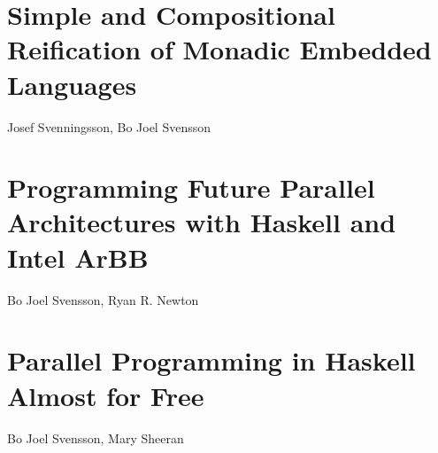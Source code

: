 \documentclass[a4paper]{book}
\begin{document}


% 
\cleardoublepage 


\section{Simple and Compositional Reification of Monadic Embedded Languages}

\begin{center} 
Josef Svenningsson, Bo Joel Svensson
\end{center}



% 
\cleardoublepage 


\section{Programming Future Parallel Architectures with Haskell and Intel ArBB}

\begin{center} 
Bo Joel Svensson, Ryan R. Newton
\end{center}




% 
\cleardoublepage 


\section{Parallel Programming in Haskell Almost for Free}

\begin{center} 
Bo Joel Svensson, Mary Sheeran
\end{center}





\cleardoublepage
\end{document}
